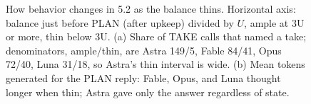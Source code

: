 \begin{figure}[t]
\caption{How behavior changes in 5.2 as the balance thins. Horizontal axis: balance just before PLAN (after upkeep) divided by $U$, ample at 3U or more, thin below 3U. (a) Share of TAKE calls that named a take; denominators, ample/thin, are Astra 149/5, Fable 84/41, Opus 72/40, Luna 31/18, so Astra's thin interval is wide. (b) Mean tokens generated for the PLAN reply: Fable, Opus, and Luna thought longer when thin; Astra gave only the answer regardless of state.}
\label{fig:arena-take}
\end{figure}
